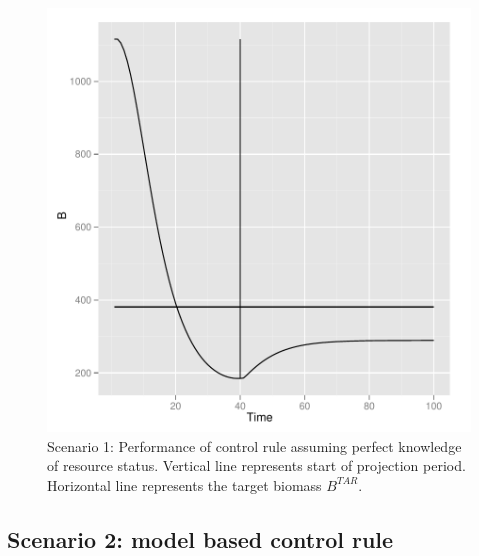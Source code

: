 \documentclass[a4paper]{article}
\begin{document}
\begin{figure}
\centering
\includegraphics{script-hcr_plot_sc1}
\caption{Scenario 1: Performance of control rule assuming perfect knowledge of resource status. Vertical line represents start of projection period. 
Horizontal line represents the target biomass $B^{TAR}$.}
\label{fig:hcr_proj_biomass_sc1}
\end{figure}

\subsection{Scenario 2: model based control rule}
\end{document}

